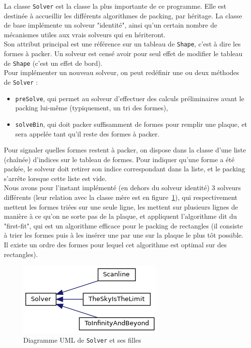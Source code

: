 La classe \texttt{Solver} est la classe la plus importante de ce programme. Elle est destinée à accueillir les différents algorithmes de packing, par héritage. La classe de base implémente un solveur "identité", ainsi qu'un certain nombre de mécanismes utiles aux vrais solveurs qui en hériteront.\\
Son attribut principal est une référence sur un tableau de \texttt{Shape}, c'est à dire les formes à packer. Un solveur est censé avoir pour seul effet de modifier le tableau de \texttt{Shape} (c'est un effet de bord).\\

Pour implémenter un nouveau solveur, on peut redéfinir une ou deux méthodes de \texttt{Solver} : \begin{itemize}
    \item \texttt{preSolve}, qui permet au solveur d'effectuer des calculs préliminaires avant le packing lui-même (typiquement, un tri des formes),
    \item  \texttt{solveBin}, qui doit packer suffisamment de formes pour remplir une plaque, et sera appelée tant qu'il reste des formes à packer.\\
\end{itemize}

Pour signaler quelles formes restent à packer, on dispose dans la classe d'une liste (chaînée) d'indices sur le tableau de formes. Pour indiquer qu'une forme a été packée, le solveur doit retirer son indice correspondant dans la liste, et le packing s'arrête lorsque cette liste est vide.\\

Nous avons pour l'instant implémenté (en dehors du solveur identité) 3 solveurs différents (leur relation avec la classe mère est en figure~\ref{fig:uml}), qui respectivement mettent les formes triées sur une seule ligne, les mettent sur plusieurs lignes de manière à ce qu'on ne sorte pas de la plaque, et appliquent l'algorithme dit du "first-fit", qui est un algorithme efficace pour le packing de rectangles (il consiste à trier les formes puis à les insérer une par une sur la plaque le plus tôt possible. Il existe un ordre des formes pour lequel cet algorithme est optimal sur des rectangles).\\

\begin{figure}[htb!]
\center
\includegraphics[scale=0.7]{img/solver_UML}
\caption{Diagramme UML de \texttt{Solver} et ses filles}
\label{fig:uml}
\end{figure}

